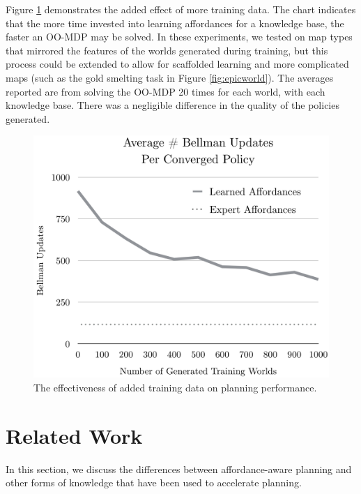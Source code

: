 \documentclass[conference]{IEEEtran}
\begin{document}
Figure \ref{fig:training_results} demonstrates the added effect of more training data. The chart indicates that the more time invested into learning affordances for a knowledge base, the faster an OO-MDP may be solved. In these experiments, we tested on map types that mirrored the features of the worlds generated during training, but this process could be extended to allow for scaffolded learning and more complicated maps (such as the gold smelting task in Figure \ref{fig:epicworld}). The averages reported are from solving the OO-MDP 20 times for each world, with each knowledge base. There was a negligible difference in the quality of the policies generated.
\begin{figure}[b]
\centering
\includegraphics[scale=0.23]{figures/training_results.png}%
  \caption{The effectiveness of added training data on planning performance.}
  \label{fig:training_results}
\end{figure}

\section{Related Work}
\label{sec:related-work}

In this section, we discuss the differences between
affordance-aware planning and other forms of knowledge that
have been used to accelerate planning.

\end{document}
